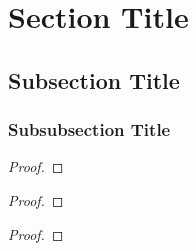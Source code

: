 \section{Section Title}

\lipsum[1]

\begin{defn}
    \lipsum[1]
\end{defn}

\begin{exmp}
    \lipsum[1]
\end{exmp}

\begin{rmrk}
    \lipsum[1]
\end{rmrk}

\subsection{Subsection Title}


\begin{defn}
    \lipsum[1]
\end{defn}

\begin{exmp}
    \lipsum[1]
\end{exmp}

\begin{rmrk}
    \lipsum[1]
\end{rmrk}

\subsubsection{Subsubsection Title}

\begin{lemm}
    \lipsum[1]
\end{lemm}

\begin{proof}
    \lipsum[1]
\end{proof}

\begin{thrm}
    \lipsum[1]
\end{thrm}

\begin{proof}
    \lipsum[1]
\end{proof}

\begin{coro}
    \lipsum[1]
\end{coro}

\begin{proof}
    \lipsum[1]
\end{proof}

